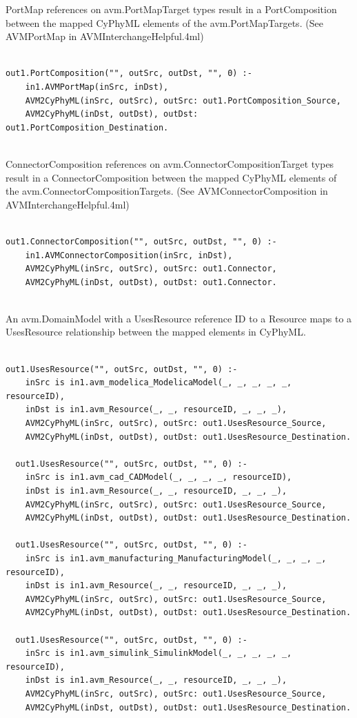 PortMap references on avm.PortMapTarget types result in a PortComposition between the mapped CyPhyML elements of the avm.PortMapTargets. (See AVMPortMap in AVMInterchangeHelpful.4ml)
\begin{lstlisting}

out1.PortComposition("", outSrc, outDst, "", 0) :-
    in1.AVMPortMap(inSrc, inDst),
    AVM2CyPhyML(inSrc, outSrc), outSrc: out1.PortComposition_Source,
    AVM2CyPhyML(inDst, outDst), outDst: out1.PortComposition_Destination.


\end{lstlisting}

ConnectorComposition references on avm.ConnectorCompositionTarget types result in a ConnectorComposition between the mapped CyPhyML elements of the avm.ConnectorCompositionTargets. (See AVMConnectorComposition in AVMInterchangeHelpful.4ml)
\begin{lstlisting}

out1.ConnectorComposition("", outSrc, outDst, "", 0) :-
    in1.AVMConnectorComposition(inSrc, inDst),
    AVM2CyPhyML(inSrc, outSrc), outSrc: out1.Connector,
    AVM2CyPhyML(inDst, outDst), outDst: out1.Connector.


\end{lstlisting}

An avm.DomainModel with a UsesResource reference ID to a Resource maps to a UsesResource relationship between the mapped elements in CyPhyML.
\begin{lstlisting}

out1.UsesResource("", outSrc, outDst, "", 0) :-
    inSrc is in1.avm_modelica_ModelicaModel(_, _, _, _, _, resourceID),
    inDst is in1.avm_Resource(_, _, resourceID, _, _, _),
    AVM2CyPhyML(inSrc, outSrc), outSrc: out1.UsesResource_Source,
    AVM2CyPhyML(inDst, outDst), outDst: out1.UsesResource_Destination.

  out1.UsesResource("", outSrc, outDst, "", 0) :-
    inSrc is in1.avm_cad_CADModel(_, _, _, _, resourceID),
    inDst is in1.avm_Resource(_, _, resourceID, _, _, _),
    AVM2CyPhyML(inSrc, outSrc), outSrc: out1.UsesResource_Source,
    AVM2CyPhyML(inDst, outDst), outDst: out1.UsesResource_Destination.

  out1.UsesResource("", outSrc, outDst, "", 0) :-
    inSrc is in1.avm_manufacturing_ManufacturingModel(_, _, _, _, resourceID),
    inDst is in1.avm_Resource(_, _, resourceID, _, _, _),
    AVM2CyPhyML(inSrc, outSrc), outSrc: out1.UsesResource_Source,
    AVM2CyPhyML(inDst, outDst), outDst: out1.UsesResource_Destination.

  out1.UsesResource("", outSrc, outDst, "", 0) :-
    inSrc is in1.avm_simulink_SimulinkModel(_, _, _, _, _, resourceID),
    inDst is in1.avm_Resource(_, _, resourceID, _, _, _),
    AVM2CyPhyML(inSrc, outSrc), outSrc: out1.UsesResource_Source,
    AVM2CyPhyML(inDst, outDst), outDst: out1.UsesResource_Destination.


\end{lstlisting}

